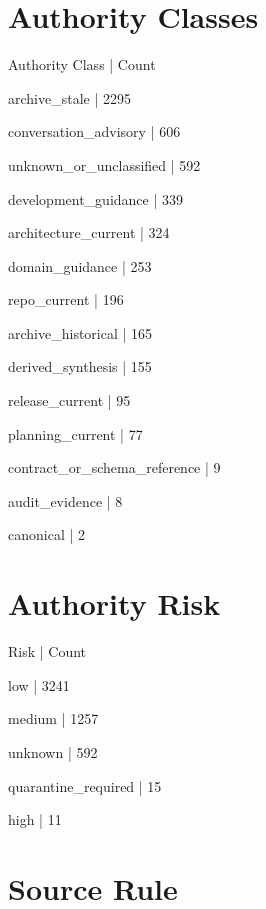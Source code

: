 \documentclass[11pt,a4paper]{report}
\begin{document}
\section{Authority Classes}

{\small\ttfamily\raggedright Authority Class | Count\par}
{\small\ttfamily\raggedright archive\_stale | 2295\par}
{\small\ttfamily\raggedright conversation\_advisory | 606\par}
{\small\ttfamily\raggedright unknown\_or\_unclassified | 592\par}
{\small\ttfamily\raggedright development\_guidance | 339\par}
{\small\ttfamily\raggedright architecture\_current | 324\par}
{\small\ttfamily\raggedright domain\_guidance | 253\par}
{\small\ttfamily\raggedright repo\_current | 196\par}
{\small\ttfamily\raggedright archive\_historical | 165\par}
{\small\ttfamily\raggedright derived\_synthesis | 155\par}
{\small\ttfamily\raggedright release\_current | 95\par}
{\small\ttfamily\raggedright planning\_current | 77\par}
{\small\ttfamily\raggedright contract\_or\_schema\_reference | 9\par}
{\small\ttfamily\raggedright audit\_evidence | 8\par}
{\small\ttfamily\raggedright canonical | 2\par}


\section{Authority Risk}

{\small\ttfamily\raggedright Risk | Count\par}
{\small\ttfamily\raggedright low | 3241\par}
{\small\ttfamily\raggedright medium | 1257\par}
{\small\ttfamily\raggedright unknown | 592\par}
{\small\ttfamily\raggedright quarantine\_required | 15\par}
{\small\ttfamily\raggedright high | 11\par}


\section{Source Rule}
\end{document}
